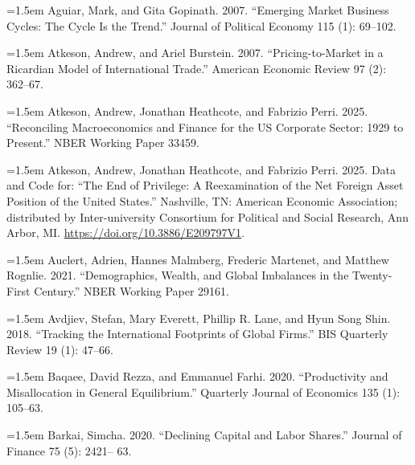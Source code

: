 \documentclass[11pt]{article}
\begin{document}
\noindent\hangindent=1.5em Aguiar, Mark, and Gita Gopinath. 2007. “Emerging Market Business Cycles: The Cycle Is the Trend.” Journal of Political Economy 115 (1): 69–102.\par

\noindent\hangindent=1.5em Atkeson, Andrew, and Ariel Burstein. 2007. “Pricing-to-Market in a Ricardian Model of International Trade.” American Economic Review 97 (2): 362–67.\par

\noindent\hangindent=1.5em Atkeson, Andrew, Jonathan Heathcote, and Fabrizio Perri. 2025. “Reconciling Macroeconomics and Finance for the US Corporate Sector: 1929 to Present.” NBER Working Paper 33459.\par

\noindent\hangindent=1.5em Atkeson, Andrew, Jonathan Heathcote, and Fabrizio Perri. 2025. Data and Code for: “The End of Privilege: A Reexamination of the Net Foreign Asset Position of the United States.” Nashville, TN: American Economic Association; distributed by Inter-university Consortium for Political and Social Research, Ann Arbor, MI. \url{https://doi.org/10.3886/E209797V1}.\par

\noindent\hangindent=1.5em Auclert, Adrien, Hannes Malmberg, Frederic Martenet, and Matthew Rognlie. 2021. “Demographics, Wealth, and Global Imbalances in the Twenty-First Century.” NBER Working Paper 29161.\par

\noindent\hangindent=1.5em Avdjiev, Stefan, Mary Everett, Phillip R. Lane, and Hyun Song Shin. 2018. “Tracking the International Footprints of Global Firms.” BIS Quarterly Review 19 (1): 47–66.\par

\noindent\hangindent=1.5em Baqaee, David Rezza, and Emmanuel Farhi. 2020. “Productivity and Misallocation in General Equilibrium.” Quarterly Journal of Economics 135 (1): 105–63.\par

\noindent\hangindent=1.5em Barkai, Simcha. 2020. “Declining Capital and Labor Shares.” Journal of Finance 75 (5): 2421– 63.\par
\end{document}
